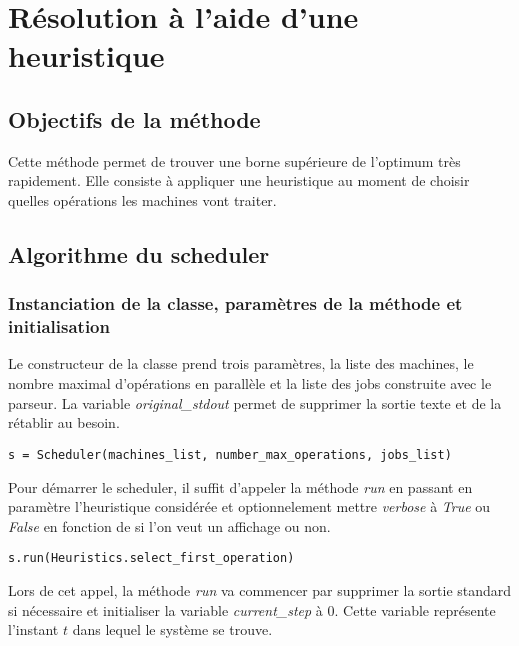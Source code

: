 \section{Résolution à l'aide d'une heuristique}

\subsection{Objectifs de la méthode}

Cette méthode permet de trouver une borne supérieure de l'optimum très rapidement. Elle consiste à appliquer une heuristique au moment de choisir quelles opérations les machines vont traiter.

\subsection{Algorithme du scheduler}

\subsubsection{Instanciation de la classe, paramètres de la méthode et initialisation}



Le constructeur de la classe prend trois paramètres, la liste des machines, le nombre maximal d'opérations en parallèle et la liste des jobs construite avec le parseur. La variable \textit{original\_stdout} permet de supprimer la sortie texte et de la rétablir au besoin.

\begin{lstlisting}
s = Scheduler(machines_list, number_max_operations, jobs_list)
\end{lstlisting}

Pour démarrer le scheduler, il suffit d'appeler la méthode \textit{run} en passant en paramètre l'heuristique considérée et optionnelement mettre \textit{verbose} à \textit{True} ou \textit{False} en fonction de si l'on veut un affichage ou non.
\begin{lstlisting}
s.run(Heuristics.select_first_operation)
\end{lstlisting}

Lors de cet appel, la méthode \textit{run} va commencer par supprimer la sortie standard si nécessaire et initialiser la variable \textit{current\_step} à $0$. Cette variable représente l'instant $t$ dans lequel le système se trouve. 

